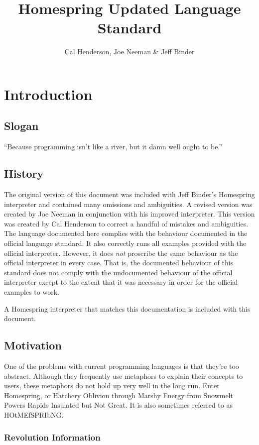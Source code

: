 \documentclass[10pt]{article}
\title{Homespring Updated Language Standard}
\author{Cal Henderson, Joe Neeman \& Jeff Binder}
\begin{document}
\maketitle

\section{Introduction}

\subsection{Slogan}

``Because programming isn't like a river, but it damn well ought to be.''

\subsection{History}
The original version of this document was included with Jeff Binder's Homespring interpreter and contained many omissions and ambiguities.
A revised version was created by Joe Neeman in conjunction with his improved interpreter.
This version was created by Cal Henderson to correct a handful of mistakes and ambiguities.
The language documented here complies with the behaviour documented in the official language standard.
It also correctly runs all examples provided with the official interpreter.
However, it does \emph{not} proscribe the same behaviour as the official interpreter in every case.
That is, the documented behaviour of this standard does not comply with the undocumented behaviour of the official interpreter
except to the extent that it was necessary in order for the official examples to work.

A Homespring interpreter that matches this documentation is included with this document.

\subsection{Motivation}

One of the problems with current programming languages is that they're too abstract.
Although they frequently use metaphors to explain their concepts to users, these metaphors do not hold up very well in the long run. 
Enter Homespring, or Hatchery Oblivion through Marshy Energy from Snowmelt Powers Rapids Insulated but Not Great.
It is also sometimes referred to as HOtMEfSPRIbNG.

\subsubsection{Revolution Information}
\end{document}
